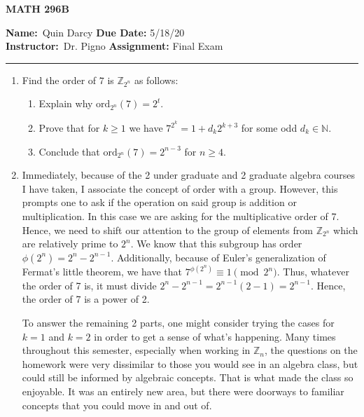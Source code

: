 \documentclass[12pt]{article}
\makeatletter
\theoremstyle{definition}
\theoremstyle{remark}
\newenvironment{solution}[1][\bf{\textit{Solution}}]{\par
  
  \normalfont \topsep6\p@\@plus6\p@\relax
  \list{}{\leftmargin=0mm
          \rightmargin=4mm
          \settowidth{\itemindent}{\itshape#1}%
          \labelwidth=\itemindent
          \parsep=0pt \listparindent=\parindent 
  }
  \item[\hskip\labelsep
        \itshape
    #1\@addpunct{.}]\ignorespaces
}{%
  \popQED\endlist\@endpefalse
}
\makeatother
\begin{document}
\thispagestyle{empty}\hline

\begin{center}
	\vspace{.4cm} {\textbf { \large MATH 296B}}
\end{center}
{\textbf{Name:}\ Quin Darcy \hspace{\fill} \textbf{Due Date:} 5/18/20   \\
{ \textbf{Instructor:}}\ Dr. Pigno \hspace{\fill} \textbf{Assignment:} Final Exam \\ \hrule}

\justifying

    \begin{enumerate}[leftmargin=*]
        \item Find the order of $7$ is $\mathbb{Z}_{2^n}$ as follows:
            \begin{enumerate}
                \item Explain why $\text{ord}_{2^n}(7)=2^t$.
                \item Prove that for $k\geq 1$ we have $7^{2^k}=1+d_k2^{k+3}$ for some odd $d_k\in\mathbb{N}$.
                \item Conclude that $\text{ord}_{2^n}(7)=2^{n-3}$ for $n\geq 4$.
            \end{enumerate}
            \begin{solution}
                Immediately, because of the 2 under graduate and 2 graduate algebra courses I have taken, I associate the concept of order with a group. However, this prompts one to ask if the operation on said group is addition or multiplication. In this case we are asking for the multiplicative order of 7. Hence, we need to shift our attention to the group of elements from $\mathbb{Z}_{2^n}$ which are relatively prime to $2^n$. We know that this subgroup has order $\phi(2^n)=2^n-2^{n-1}$. Additionally, because of Euler's generalization of Fermat's little theorem, we have that $7^{\phi(2^n)}\equiv 1\pmod{2^n}$. Thus, whatever the order of 7 is, it must divide $2^n-2^{n-1}=2^{n-1}(2-1)=2^{n-1}$. Hence, the order of 7 is a power of 2.\par\hspace{4mm} To answer the remaining 2 parts, one might consider trying the cases for $k=1$ and $k=2$ in order to get a sense of what's happening. Many times throughout this semester, especially when working in $\mathbb{Z}_n$, the questions on the homework were very dissimilar to those you would see in an algebra class, but could still be informed by algebraic concepts. That is what made the class so enjoyable. It was an entirely new area, but there were doorways to familiar concepts that you could move in and out of. 

\end{solution}
\end{enumerate}
\end{document}
